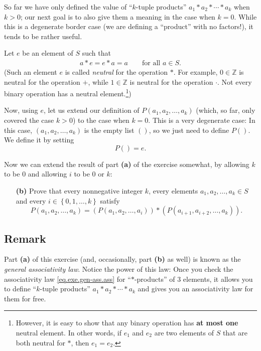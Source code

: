 \documentclass[paper=a4, fontsize=12pt]{scrartcl} %
\newcommand{\ZZ}{\mathbb{Z}} %
\newcommand{\set}[1]{\left\{ #1 \right\}}
\newcommand{\tup}[1]{\left( #1 \right)}
\theoremstyle{plainsl}
\theoremstyle{definition}
\theoremstyle{remark}
\begin{document}
So far we have only defined the value of ``$k$-tuple
products'' $a_1 * a_2 * \cdots * a_k$ when $k > 0$;
our next goal is to also give them a meaning in the
case when $k = 0$.
While this is a degenerate border case (we are defining
a ``product'' with no factors!), it tends to be rather
useful.

Let $e$ be an element of $S$ such that
\begin{align}
a * e = e * a = a \qquad \text{for all $a \in S$.}
\label{eq.exe.gen-ass.neu}
\end{align}
(Such an element $e$ is called \textit{neutral} for the
operation $*$. For example, $0 \in \ZZ$ is neutral for
the operation $+$, while $1 \in \ZZ$ is neutral for
the operation $\cdot$. Not every binary operation has
a neutral element.\footnote{However, it is easy to show
that any binary operation has \textbf{at most one}
neutral element. In other words, if $e_1$ and $e_2$
are two elements of $S$ that are both neutral for $*$,
then $e_1 = e_2$.})

Now, using $e$, let us extend our definition of
$P \tup{a_1, a_2, \ldots, a_k}$ (which, so far, only
covered the case $k > 0$) to the case when $k = 0$.
This is a very degenerate case: In this case,
$\tup{a_1, a_2, \ldots, a_k}$ is the empty list $\tup{}$,
so we just need to define $P \tup{}$.
We define it by setting
\[
P \tup{} = e .
\]

Now we can extend the result of part \textbf{(a)}
of the exercise somewhat, by allowing $k$ to be $0$
and allowing $i$ to be $0$ or $k$:

\begin{enumerate}

\item[\textbf{(b)}]
Prove that 
every nonnegative integer $k$, every elements
$a_1, a_2, \ldots, a_k \in S$
and every $i \in \set{0, 1, \ldots, k}$ satisfy
\[
P \tup{a_1, a_2, \ldots, a_k}
= \tup{P \tup{a_1, a_2, \ldots, a_i}}
     * \tup{P \tup{a_{i+1}, a_{i+2}, \ldots, a_k}} .
\]

\end{enumerate}

\subsection{Remark}

Part \textbf{(a)} of this exercise (and, occasionally,
part \textbf{(b)} as well) is known as the
\textit{general associativity law}.
Notice the power of this law:
Once you check the associativity law
\eqref{eq.exe.gen-ass.ass} for ``$*$-products'' of $3$ elements,
it allows you to define
``$k$-tuple products'' $a_1 * a_2 * \cdots * a_k$
and gives you an associativity law for them
for free.
\end{document}
